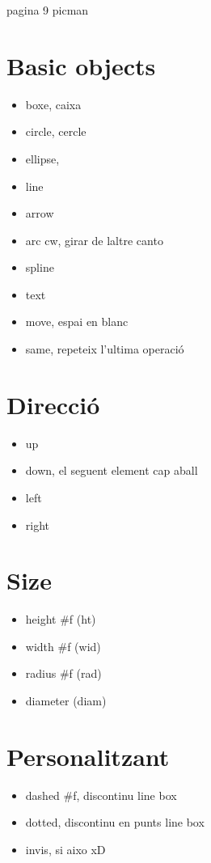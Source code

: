 pagina 9 picman

\section{Basic objects}
\begin{itemize}
\item boxe, caixa
\item circle, cercle
\item ellipse, 
\item line
	\subitem <->
\item arrow
\item arc
	\subitem cw, girar de laltre canto
\item spline
\item text
\item move, espai en blanc
\item same, repeteix l'ultima operació
\end{itemize}

\section{Direcció}
\begin{itemize}
\item up
\item down, el seguent element cap aball
\item left
\item right
\end{itemize}

\section{Size}
\begin{itemize}
\item height #f (ht)
\item width #f (wid)
\item radius #f (rad)
\item diameter (diam)
\end{itemize}

\section{Personalitzant}
\begin{itemize}
\item dashed #f, discontinu
	\subitem line
	\subitem box
\item dotted, discontinu en punts
	\subitem line
	\subitem box
\item invis, si aixo xD
\end{itemize}

